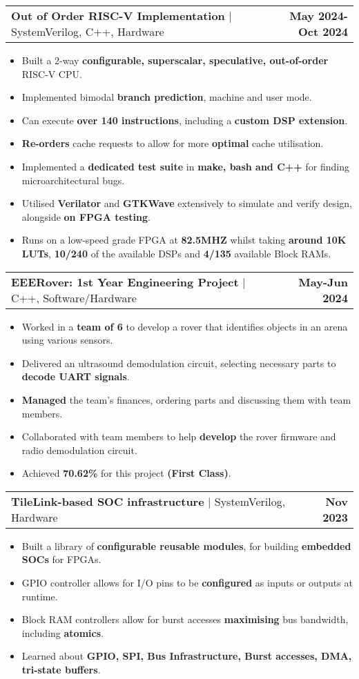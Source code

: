\documentclass[a4paper,11pt]{article}
\makeatletter
\newcommand{\resumeItem}[1]{
  \item\small{
    {#1 \vspace{-2pt}}
  }
}
\newcommand{\resumeProjectHeading}[2]{
    \item
    \begin{tabular*}{1.001\textwidth}{l@{\extracolsep{\fill}}r}
      \small#1 & \textbf{\small #2}\\
    \end{tabular*}\vspace{-7pt}
}
\newcommand{\resumeItemListStart}{\begin{itemize}}
\newcommand{\resumeItemListEnd}{\end{itemize}\vspace{-5pt}}
\makeatother
\begin{document}
\resumeProjectHeading {\textbf{Out of Order RISC-V Implementation} \href{https://github.com/AyuubMohamud/Biriq}{\scalebox{0.75}\faLink} $|$ SystemVerilog, C++, Hardware} {May 2024-Oct 2024}
\resumeItemListStart
\resumeItem{Built a 2-way \textbf{configurable, superscalar, speculative, out-of-order} RISC-V CPU.}
\resumeItem{Implemented bimodal\textbf{ branch prediction}, machine and user mode.}
\resumeItem{Can execute \textbf{over 140 instructions}, including a \textbf{custom DSP extension}.}
\resumeItem{\textbf{Re-orders} cache requests to allow for more \textbf{optimal} cache utilisation.}
\resumeItem{Implemented a\textbf{ dedicated test suite} \href{https://github.com/AyuubMohamud/biriqTests}{\scalebox{0.75}\faLink}  in \textbf{make, bash and C++} for finding microarchitectural bugs.}
\resumeItem{Utilised\textbf{ Verilator} and \textbf{GTKWave} extensively to simulate and verify design, alongside \textbf{on FPGA testing}.}
\resumeItem{Runs on a low-speed grade FPGA at \textbf{82.5MHZ} whilst taking \textbf{around 10K LUTs}, \textbf{10/240} of the available DSPs and \textbf{4/135} available Block RAMs.}
\resumeItemListEnd

\resumeProjectHeading{\textbf{EEERover: 1st Year Engineering Project} $|$ C++, Software/Hardware}{May-Jun 2024}
\resumeItemListStart
\resumeItem{Worked in a \textbf{team of 6} to develop a rover that identifies objects in an arena using various sensors.}
\resumeItem{Delivered an ultrasound demodulation circuit, selecting necessary parts to \textbf{decode UART signals}.}
\resumeItem{\textbf{Managed} the team's finances, ordering parts and discussing them with team members.}
\resumeItem{Collaborated with team members to help \textbf{develop} the rover firmware and radio demodulation circuit.}
\resumeItem{Achieved \textbf{70.62\%} for this project \textbf{(First Class)}.}
\resumeItemListEnd

\resumeProjectHeading{\textbf{TileLink-based SOC infrastructure} \href{https://github.com/AyuubMohamud/TileLinkIP}{\scalebox{0.75}\faLink} $|$ SystemVerilog, Hardware }{Nov 2023}
\resumeItemListStart
\resumeItem{Built a library of \textbf{configurable reusable modules}, for building \textbf{embedded SOCs} for FPGAs.}
\resumeItem{GPIO controller allows for I/O pins to be \textbf{configured} as inputs or outputs at runtime.}
\resumeItem{Block RAM controllers allow for burst accesses \textbf{maximising} bus bandwidth, including \textbf{atomics}.}
\resumeItem{Learned about \textbf{GPIO, SPI, Bus Infrastructure, Burst accesses, DMA, tri-state buffers}.}
\resumeItemListEnd
\end{document}
